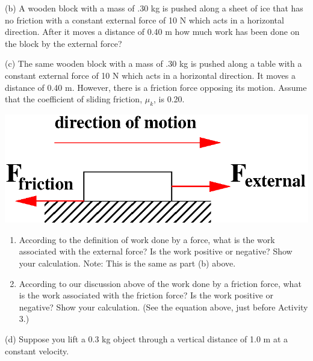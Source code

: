 (b) A wooden block with a mass of .30 kg is pushed along a sheet of ice that
has no friction with a constant external force of 10 N which acts in a 
horizontal direction. After it moves a distance of 0.40 m how much work has 
been done on the block by the external force?
\vspace{20mm}

(c) The same wooden block with a mass of .30 kg is pushed along a table with
a constant external force of 10 N which acts in a horizontal direction. It moves
a distance of 0.40 m. However, there is a friction force opposing its motion.
Assume that the coefficient of sliding friction, \( \mu _{k} \), is 0.20. 

\vspace{0.3cm}
{\par\centering \includegraphics{work_power/work_power_fig4b.eps} \par}
\vspace{0.3cm}

\begin{enumerate}
\item According to the definition of work done by a force, what is the work associated with the external force? Is the work positive or negative? Show your calculation. Note: This is the same as part (b) above.
\vspace{20mm}

\item According to our discussion above of the work done by a friction force, what is the work associated with the friction force? Is the work positive or negative? Show your calculation. (See the equation above, just before Activity 3.)
\vspace{20mm}

\end{enumerate}
(d) Suppose you lift a 0.3 kg object through a vertical distance of 1.0 m at a constant velocity.

